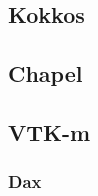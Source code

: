 \cite{hornung2014raja}
\cite{hornung2016raja}

\subsection*{\textbf{Kokkos}}

\cite{edwards2014kokkos}
\cite{edwards2012manycore}

\subsection*{\textbf{Chapel}}

\cite{chamberlain2007parallel}
\cite{sidelnik2012performance}

\subsection*{\textbf{VTK-m}}

\cite{moreland2015vtk}
\cite{moreland2014vtk}

\subsubsection*{Dax} 
\cite{morelanddax}
\cite{moreland2011dax}
